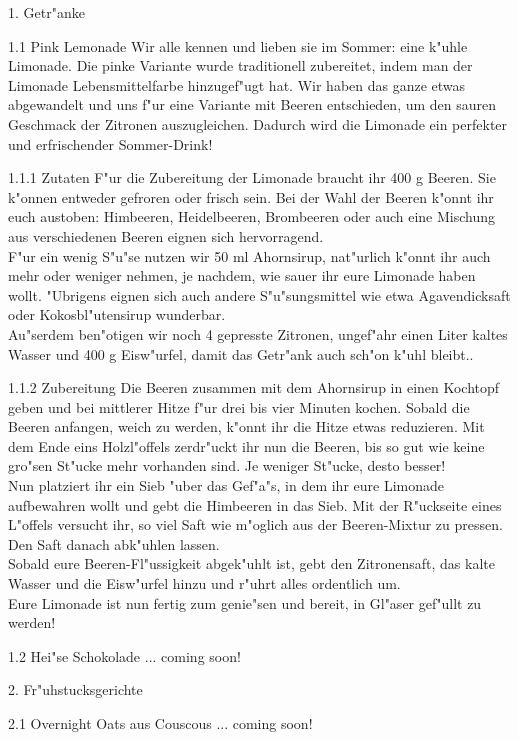 
	1. Getr"anke
	
	1.1 Pink Lemonade
	Wir alle kennen und lieben sie im Sommer: eine k"uhle Limonade. Die pinke Variante wurde traditionell zubereitet, indem man der Limonade Lebensmittelfarbe hinzugef"ugt hat. Wir haben das ganze etwas abgewandelt und uns f"ur eine Variante mit Beeren entschieden, um den sauren Geschmack der Zitronen auszugleichen. Dadurch wird die Limonade ein perfekter und erfrischender Sommer-Drink!
	
	1.1.1 Zutaten
	F"ur die Zubereitung der Limonade braucht ihr 400 g Beeren. Sie k"onnen entweder gefroren oder frisch sein. Bei der Wahl der Beeren k"onnt ihr euch austoben: Himbeeren, Heidelbeeren, Brombeeren oder auch eine Mischung aus verschiedenen Beeren eignen sich hervorragend. \\
	F"ur ein wenig S"u"se nutzen wir 50 ml Ahornsirup, nat"urlich k"onnt ihr auch mehr oder weniger nehmen, je nachdem, wie sauer ihr eure Limonade haben wollt. "Ubrigens eignen sich auch andere S"u"sungsmittel wie etwa Agavendicksaft oder Kokosbl"utensirup wunderbar. \\
	Au"serdem ben"otigen wir noch 4 gepresste Zitronen, ungef"ahr einen Liter kaltes Wasser und 400 g Eisw"urfel, damit das Getr"ank auch sch"on k"uhl bleibt..
	
	1.1.2 Zubereitung
	Die Beeren zusammen mit dem Ahornsirup in einen Kochtopf geben und bei mittlerer Hitze f"ur drei bis vier Minuten kochen. Sobald die Beeren anfangen, weich zu werden, k"onnt ihr die Hitze etwas reduzieren. Mit dem Ende eins Holzl"offels zerdr"uckt ihr nun die Beeren, bis so gut wie keine gro"sen St"ucke mehr vorhanden sind. Je weniger St"ucke, desto besser! \\
	Nun platziert ihr ein Sieb "uber das Gef"a"s, in dem ihr eure Limonade aufbewahren wollt und gebt die Himbeeren in das Sieb. Mit der R"uckseite eines L"offels versucht ihr, so viel Saft wie m"oglich aus der Beeren-Mixtur zu pressen. Den Saft danach abk"uhlen lassen. \\
	Sobald eure Beeren-Fl"ussigkeit abgek"uhlt ist, gebt den Zitronensaft, das kalte Wasser und die Eisw"urfel hinzu und r"uhrt alles ordentlich um. \\
	Eure Limonade ist nun fertig zum genie"sen und bereit, in Gl"aser gef"ullt zu werden!
	
	1.2 Hei"se Schokolade
	... coming soon!
	
	2. Fr"uhstucksgerichte
	
	2.1 Overnight Oats aus Couscous
	... coming soon!
	